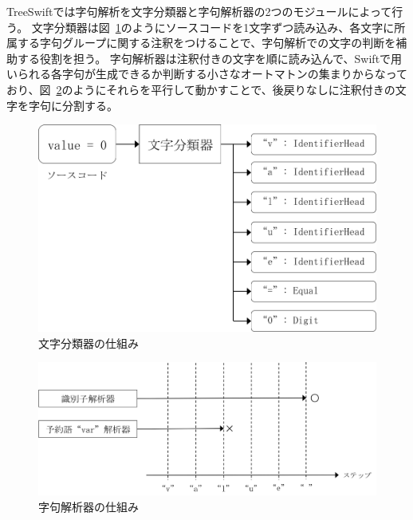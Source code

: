TreeSwiftでは字句解析を文字分類器と字句解析器の2つのモジュールによって行う。
文字分類器は図~\ref{img:character-classifier}のようにソースコードを1文字ずつ読み込み、各文字に所属する字句グループに関する注釈をつけることで、字句解析での文字の判断を補助する役割を担う。
字句解析器は注釈付きの文字を順に読み込んで、Swiftで用いられる各字句が生成できるか判断する小さなオートマトンの集まりからなっており、図~\ref{img:lexical-analyzer}のようにそれらを平行して動かすことで、後戻りなしに注釈付きの文字を字句に分割する。

\begin{figure}
    \begin{center}
        \includegraphics[scale=0.8]{./img/character_classifier.png}
        \caption{文字分類器の仕組み}
        \label{img:character-classifier}
    \end{center}
\end{figure}

\begin{figure}
    \begin{center}
        \includegraphics[scale=0.8]{./img/lexical_analyzer.png}
        \caption{字句解析器の仕組み}
        \label{img:lexical-analyzer}
    \end{center}
\end{figure}

